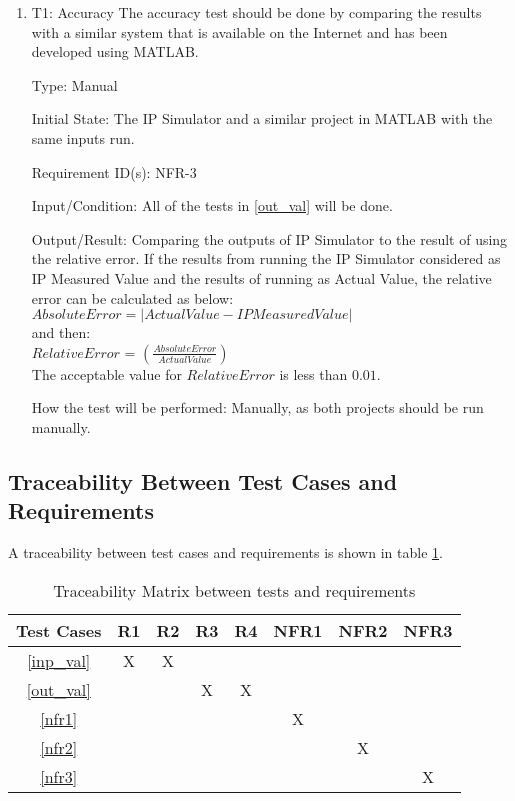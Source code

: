 \documentclass[12pt, titlepage]{article}
\begin{document}
\begin{enumerate}

\item{T1: Accuracy}
\vspace{3mm}
\newline
The accuracy test should be done by comparing the results with a similar system that is available on the Internet and has been developed using MATLAB. \cite{al-khazraji_2022} 

Type: Manual
					
Initial State: The IP Simulator and a similar project in MATLAB with the same inputs run.

Requirement ID(s): NFR-3			

Input/Condition: All of the tests in \ref{out_val} will be done.

Output/Result: Comparing the outputs of IP Simulator to the result of \cite{al-khazraji_2022} using the relative error. If the results from running the IP Simulator considered as IP Measured Value and the results of running \cite{al-khazraji_2022} as Actual Value, the relative error can be calculated as below:\\
$Absolute Error = |Actual Value - IP Measured Value|$\\
and then:\\
$Relative Error$ = $(\frac{Absolute Error}{Actual Value})$\\
\newline
The acceptable value for $Relative Error$ is  less than $0.01$.

How the test will be performed: Manually, as both projects should be run manually.

\end{enumerate}

\subsection{Traceability Between Test Cases and Requirements}
A traceability between test cases and requirements is shown in table \ref{tbl_rel}.


\begin{table} [ht]
\caption{Traceability Matrix between tests and requirements}\label{tbl_rel}
\vspace*{3mm}
\centering
\begin{tabular}{|c|c| c| c| c | c|c | c|}
\hline
Test Cases & R1 & R2 & R3& R4& NFR1& NFR2&NFR3  \\
 \hline   
 \ref{inp_val} &X &X & & &&& \\
 \hline
  \ref{out_val}   & & & X&X & && \\
 \hline
  \ref{nfr1}   && & & &  X&&\\
 \hline
  \ref{nfr2}  &&& & &  &X&\\
 \hline
  \ref{nfr3}  &&& & &  &&X\\
 \hline
\end{tabular}

\end{table}
\end{document}
